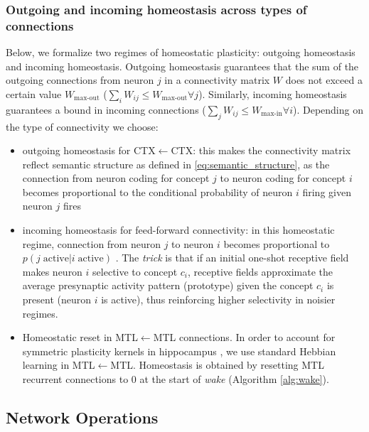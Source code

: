 \documentclass{article}
\begin{document}
\subsubsection*{Outgoing and incoming homeostasis across types of connections}
Below, we formalize two regimes of homeostatic plasticity: outgoing homeostasis and incoming homeostasis. Outgoing homeostasis guarantees that the sum of the outgoing connections from neuron $j$ in a connectivity matrix $W$ does not exceed a certain value $W_\textrm{max-out}$ ($\sum_iW_{ij} \leq W_\textrm{max-out} \forall j$). Similarly, incoming homeostasis guarantees a bound in incoming connections ($\sum_jW_{ij} \leq W_\textrm{max-in} \forall i$). Depending on the type of connectivity we choose:
\begin{itemize}
    \item outgoing homeostasis for CTX$\leftarrow$CTX: this makes the connectivity matrix reflect semantic structure as defined in \eqref{eq:semantic_structure}, as the connection from neuron coding for concept $j$ to neuron coding for concept $i$ becomes proportional to the conditional probability of neuron $i$ firing given neuron $j$ fires 
    \item incoming homeostasis for feed-forward connectivity: in this homeostatic regime, connection from neuron $j$ to neuron $i$ becomes proportional to $p(j \; \textrm{active} | i\; \textrm{active})$ . The \textit{trick} is that if an initial one-shot receptive field makes neuron $i$ selective to concept $c_i$, receptive fields approximate the average presynaptic activity pattern (prototype) given the concept $c_i$ is present (neuron $i$ is active), thus reinforcing higher selectivity in noisier regimes.
    \item Homeostatic reset in MTL$\leftarrow$MTL connections. In order to account for symmetric plasticity kernels in hippocampus , we use standard Hebbian learning in MTL$\leftarrow$MTL. Homeostasis is obtained by resetting MTL recurrent connections to 0 at the start of \textit{wake} (Algorithm \ref{alg:wake}).
\end{itemize}
\subsection*{Network Operations}
\end{document}
